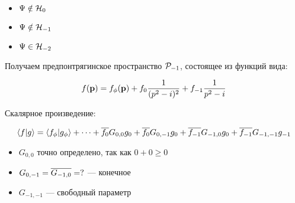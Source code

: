 \begin{itemize}
\item $\Psi \notin \mathcal{H}_{0}$ 
\item $\Psi \notin \mathcal{H}_{-1}$
\item $\Psi \in \mathcal{H}_{-2}$
\end{itemize}


Получаем предпонтрягинское пространство $\mathcal{P}_{-1}$, состоящее из функций вида:

\[
f(\vb{p}) = f_\phi(\vb{p}) + f_0 \frac{1}{(p^2 - i)^2} + f_{-1} \frac{1}{p^2 - i}
\]

Скалярное произведение:

\[
\ip{f}{g} = \ip{f_\phi}{g_\phi} + \dots + \cconj{f_0} G_{0,0} g_0 + \cconj{f_0} G_{0, -1} g_0 + \cconj{f_{-1}} G_{-1, 0} g_0 + \cconj{f_{-1}} G_{-1, -1} g_{-1}
\]

\begin{itemize}
\item $G_{0, 0}$ точно определено, так как $0 + 0 \ge 0$
\item $G_{0, -1} = \overline{G_{-1, 0}} = ?$ — конечное
\item $G_{-1, -1}$ — свободный параметр
\end{itemize}